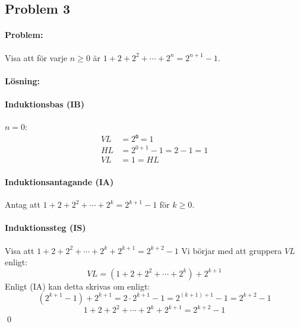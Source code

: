 \subsection*{Problem 3}

\paragraph{Problem:} Visa att för varje $n\ge 0$ är \(1+2+2^2+\cdots+2^n=2^{n+1}-1.\)

\paragraph{Lösning:}

\paragraph{Induktionsbas (IB)} $n=0$:
\begin{align*}
VL &= 2⁰ = 1 \\[5pt]
HL &= 2^{0+1}-1 = 2-1 = 1 \\[5pt]
VL &= 1 = HL
\end{align*}

\paragraph{Induktionsantagande (IA)} Antag att \(1+2+2^2+\cdots+2^k=2^{k+1}-1\) för $k\ge0$.

\paragraph{Induktionssteg (IS)} Visa att \(1+2+2^2+\cdots+2^k+2^{k+1}=2^{k+2}-1\)
\newline Vi börjar med att gruppera $VL$ enligt:
\[VL = (1+2+2^2+\cdots+2^k)+2^{k+1}\]
Enligt (IA) kan detta skrivas om enligt:
\[(2^{k+1}-1)+2^{k+1} = 2\cdot2^{k+1}-1 = 2^{(k+1)+1}-1 = 2^{k+2}-1\]
\[1+2+2^2+\cdots+2^k+2^{k+1}=2^{k+2}-1\]
\hfill\qed